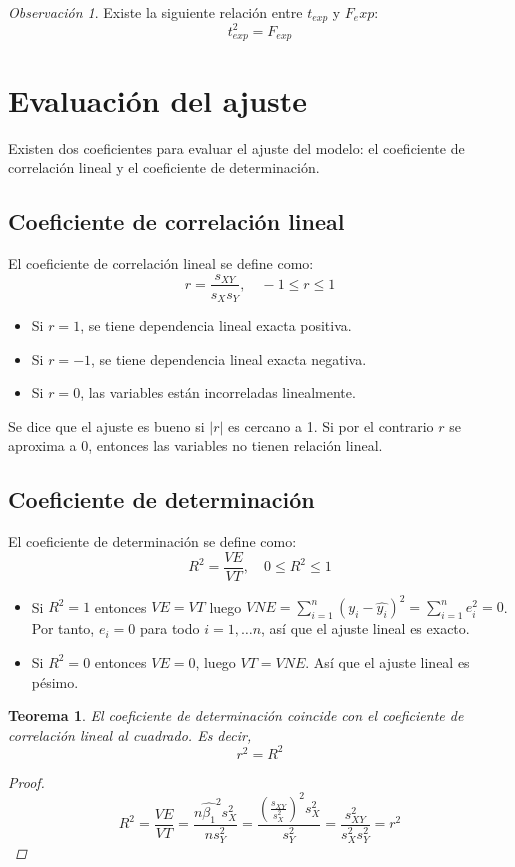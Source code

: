 \documentclass{report}
\newtheorem{theorem}{Teorema}[chapter]
\theoremstyle{remark}
\newtheorem*{remark}{Observación}
\theoremstyle{remark}
\theoremstyle{remark}
\theoremstyle{definition}
\theoremstyle{definition}
\theoremstyle{definition}
\begin{document}
\begin{remark}
    Existe la siguiente relación entre $t_{exp}$ y $F_exp$:
    $$t_{exp}^2 = F_{exp}$$
\end{remark}

\section{Evaluación del ajuste}
Existen dos coeficientes para evaluar el ajuste del modelo: el coeficiente de correlación lineal y el coeficiente de determinación.

\subsection*{Coeficiente de correlación lineal}
El coeficiente de correlación lineal se define como:
$$r = \frac{s_{XY}}{s_X s_Y}, \quad -1 \leq r \leq 1$$
\begin{itemize}
    \item Si $r = 1$, se tiene dependencia lineal exacta positiva.
    \item Si $r = -1$, se tiene dependencia lineal exacta negativa.
    \item Si $r = 0$, las variables están incorreladas linealmente.
\end{itemize}
Se dice que el ajuste es bueno si $|r|$ es cercano a 1.
Si por el contrario $r$ se aproxima a 0, entonces las variables no tienen relación lineal.

\subsection*{Coeficiente de determinación}
El coeficiente de determinación se define como:
$$R^2 = \frac{VE}{VT}, \quad 0 \leq R^2 \leq 1$$
\begin{itemize}
    \item Si $R^2 = 1$ entonces $VE = VT$ luego $VNE = \sum_{i=1}^n (y_i - \hat{y_i})^2 = \sum_{i=1}^n e_i^2 = 0$.
          Por tanto, $e_i = 0$ para todo $i = 1, \dots n$, así que el ajuste lineal es exacto.
    \item Si $R^2 = 0$ entonces $VE = 0$, luego $VT = VNE$.
          Así que el ajuste lineal es pésimo.
\end{itemize}

\begin{theorem}
    El coeficiente de determinación coincide con el coeficiente de correlación lineal al cuadrado.
    Es decir, $$r^2 = R^2$$

    \begin{proof}
        $$R^2 = \frac{VE}{VT} = \frac{n\hat{\beta_1}^2s_X^2}{ns_Y^2} = \frac{\left(\frac{s_{XY}}{s_X^2}\right)^2 s_X^2}{s_Y^2} = \frac{s_{XY}^2}{s_X^2 s_Y^2} = r^2$$
    \end{proof}
\end{theorem}
\end{document}
